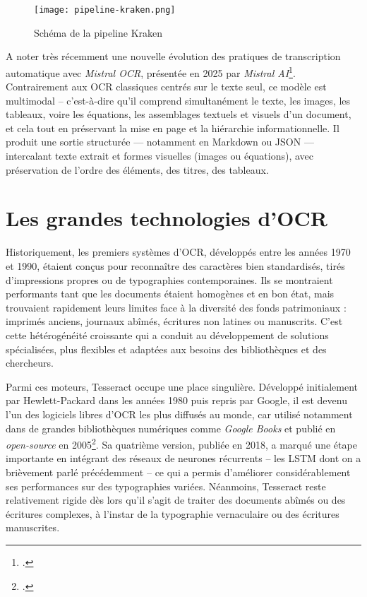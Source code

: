 \begin{figure}[htbp]
\centering
\texttt{[image: pipeline-kraken.png]}
\caption{Schéma de la pipeline Kraken}
\label{fig:pipeline-kraken}
\end{figure}

A noter très récemment une nouvelle évolution des pratiques de transcription automatique avec \emph{Mistral OCR}, présentée en 2025 par \emph{Mistral AI}\footcite[][]{mistralocr}. Contrairement aux OCR classiques centrés sur le texte seul, ce modèle est multimodal -- c'est-à-dire qu'il comprend simultanément le texte, les images, les tableaux, voire les équations, les assemblages textuels et visuels d’un document, et cela tout en préservant la mise en page et la hiérarchie informationnelle. Il produit une sortie structurée — notamment en Markdown ou JSON — intercalant texte extrait et formes visuelles (images ou équations), avec préservation de l’ordre des éléments, des titres, des tableaux.

\section{Les grandes technologies d'OCR}

Historiquement, les premiers systèmes d’OCR, développés entre les années 1970 et 1990, étaient conçus pour reconnaître des caractères bien standardisés, tirés d’impressions propres ou de typographies contemporaines. Ils se montraient performants tant que les documents étaient homogènes et en bon état, mais trouvaient rapidement leurs limites face à la diversité des fonds patrimoniaux : imprimés anciens, journaux abîmés, écritures non latines ou manuscrits. C’est cette hétérogénéité croissante qui a conduit au développement de solutions spécialisées, plus flexibles et adaptées aux besoins des bibliothèques et des chercheurs.

Parmi ces moteurs, Tesseract occupe une place singulière. Développé initialement par Hewlett-Packard dans les années 1980 puis repris par Google, il est devenu l’un des logiciels libres d’OCR les plus diffusés au monde, car utilisé notamment dans de grandes bibliothèques numériques comme \emph{Google Books} et publié en \emph{open-source} en 2005\footcite[][]{smith}. Sa quatrième version, publiée en 2018, a marqué une étape importante en intégrant des réseaux de neurones récurrents -- les LSTM dont on a brièvement parlé précédemment -- ce qui a permis d’améliorer considérablement ses performances sur des typographies variées. Néanmoins, Tesseract reste relativement rigide dès lors qu’il s’agit de traiter des documents abîmés ou des écritures complexes, à l'instar de la typographie vernaculaire ou des écritures manuscrites.

